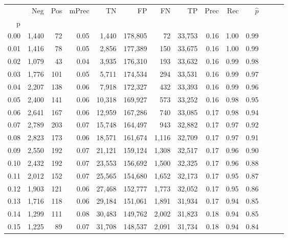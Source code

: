 \begin{tabular}{rrrrrrrrrrrrrr}
\toprule
{} &    Neg &  Pos & mPrec &       TN &       FP &      FN &      TP &  Prec &   Rec & $\hat{p}$ \\
p    &        &      &       &          &          &         &         &       &       &           \\
\midrule
0.00 &  1,440 &   72 &  0.05 &    1,440 &  178,805 &      72 &  33,753 &  0.16 &  1.00 &      0.99 \\
0.01 &  1,416 &   78 &  0.05 &    2,856 &  177,389 &     150 &  33,675 &  0.16 &  1.00 &      0.99 \\
0.02 &  1,079 &   43 &  0.04 &    3,935 &  176,310 &     193 &  33,632 &  0.16 &  0.99 &      0.98 \\
0.03 &  1,776 &  101 &  0.05 &    5,711 &  174,534 &     294 &  33,531 &  0.16 &  0.99 &      0.97 \\
0.04 &  2,207 &  138 &  0.06 &    7,918 &  172,327 &     432 &  33,393 &  0.16 &  0.99 &      0.96 \\
0.05 &  2,400 &  141 &  0.06 &   10,318 &  169,927 &     573 &  33,252 &  0.16 &  0.98 &      0.95 \\
0.06 &  2,641 &  167 &  0.06 &   12,959 &  167,286 &     740 &  33,085 &  0.17 &  0.98 &      0.94 \\
0.07 &  2,789 &  203 &  0.07 &   15,748 &  164,497 &     943 &  32,882 &  0.17 &  0.97 &      0.92 \\
0.08 &  2,823 &  173 &  0.06 &   18,571 &  161,674 &   1,116 &  32,709 &  0.17 &  0.97 &      0.91 \\
0.09 &  2,550 &  192 &  0.07 &   21,121 &  159,124 &   1,308 &  32,517 &  0.17 &  0.96 &      0.90 \\
0.10 &  2,432 &  192 &  0.07 &   23,553 &  156,692 &   1,500 &  32,325 &  0.17 &  0.96 &      0.88 \\
0.11 &  2,012 &  152 &  0.07 &   25,565 &  154,680 &   1,652 &  32,173 &  0.17 &  0.95 &      0.87 \\
0.12 &  1,903 &  121 &  0.06 &   27,468 &  152,777 &   1,773 &  32,052 &  0.17 &  0.95 &      0.86 \\
0.13 &  1,716 &  118 &  0.06 &   29,184 &  151,061 &   1,891 &  31,934 &  0.17 &  0.94 &      0.85 \\
0.14 &  1,299 &  111 &  0.08 &   30,483 &  149,762 &   2,002 &  31,823 &  0.18 &  0.94 &      0.85 \\
0.15 &  1,225 &   89 &  0.07 &   31,708 &  148,537 &   2,091 &  31,734 &  0.18 &  0.94 &      0.84 \\

\end{tabular}
